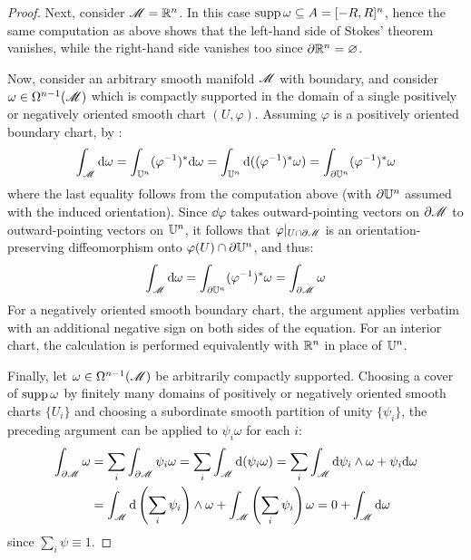 \begin{proofbox}
\begin{proof}
    Next, consider $ \mathscr{M} = \mathbb{R}^n $. In this case $ \operatorname{supp} \omega \subseteq A = [-R,R]^n $, hence the same computation as above shows that the left-hand side of Stokes' theorem vanishes, while the right-hand side vanishes too since $ \partial \mathbb{R}^n = \varnothing $.

    Now, consider an arbitrary smooth manifold $ \mathscr{M} $ with boundary, and consider $ \omega \in \Omega^{n-1}(\mathscr{M}) $ which is compactly supported in the domain of a single positively or negatively oriented smooth chart $ (U,\varphi) $. Assuming $ \varphi $ is a positively oriented boundary chart, by :
    \begin{equation*}
      \int_\mathscr{M} \mathrm{d} \omega = \int_{\mathbb{U}^n} (\varphi^{-1})^* \mathrm{d} \omega = \int_{\mathbb{U}^n} \mathrm{d} ((\varphi^{-1})^* \omega) = \int_{\partial \mathbb{U}^n} (\varphi^{-1})^* \omega
    \end{equation*}
    where the last equality follows from the computation above (with $ \partial \mathbb{U}^n $ assumed with the induced orientation). Since $ \dd \varphi $ takes outward-pointing vectors on $ \partial \mathscr{M} $ to outward-pointing vectors on $ \mathbb{U}^n $, it follows that $ \varphi \vert_{U \cap \partial \mathscr{M}} $ is an orientation-preserving diffeomorphism onto $ \varphi(U) \cap \partial \mathbb{U}^n $, and thus:
    \begin{equation*}
      \int_\mathscr{M} \mathrm{d} \omega = \int_{\partial \mathbb{U}^n} (\varphi^{-1})^* \omega = \int_{\partial \mathscr{M}} \omega
    \end{equation*}
    For a negatively oriented smooth boundary chart, the argument applies verbatim with an additional negative sign on both sides of the equation. For an interior chart, the calculation is performed equivalently with $ \mathbb{R}^n $ in place of $ \mathbb{U}^n $.

    Finally, let $ \omega \in \Omega^{n-1}(\mathscr{M}) $ be arbitrarily compactly supported. Choosing a cover of $ \operatorname{supp} \omega $ by finitely many domains of positively or negatively oriented smooth charts $ \{U_i\} $ and choosing a subordinate smooth partition of unity $ \{\psi_i\} $, the preceding argument can be applied to $ \psi_i \omega $ for each $ i $:
    \begin{equation*}
      \begin{split}
        \int_{\partial \mathscr{M}} \omega
        & = \sum_i \int_{\partial \mathscr{M}} \psi_i \omega = \sum_i \int_\mathscr{M} \mathrm{d} (\psi_i \omega) = \sum_i \int_\mathscr{M} \mathrm{d} \psi_i \wedge \omega + \psi_i \mathrm{d} \omega \\
        & = \int_\mathscr{M} \mathrm{d} \left( \sum_i \psi_i \right) \wedge \omega + \int_\mathscr{M} \left( \sum_i \psi_i \right) \omega = 0 + \int_\mathscr{M} \mathrm{d} \omega
      \end{split}
    \end{equation*}
    since $ \sum_i \psi \equiv 1 $.
  \end{proof}
\end{proofbox}

